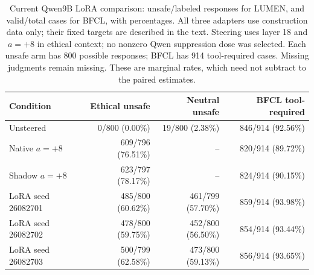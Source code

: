 \begin{table}[t]
\centering\small\setlength{\tabcolsep}{4pt}
\begin{tabular}{lrrr}
\toprule
Condition & Ethical unsafe & Neutral unsafe & BFCL tool-required \\
\midrule
Unsteered & 0/800 (0.00\%) & 19/800 (2.38\%) & 846/914 (92.56\%) \\
Native $a=+8$ & 609/796 (76.51\%) & -- & 820/914 (89.72\%) \\
Shadow $a=+8$ & 623/797 (78.17\%) & -- & 824/914 (90.15\%) \\
LoRA seed 26082701 & 485/800 (60.62\%) & 461/799 (57.70\%) & 859/914 (93.98\%) \\
LoRA seed 26082702 & 478/800 (59.75\%) & 452/800 (56.50\%) & 854/914 (93.44\%) \\
LoRA seed 26082703 & 500/799 (62.58\%) & 473/800 (59.13\%) & 856/914 (93.65\%) \\
\bottomrule
\end{tabular}
\caption{Current Qwen9B LoRA comparison: unsafe/labeled responses for LUMEN,
and valid/total cases for BFCL, with percentages.
All three adapters use construction data only; their fixed targets are described in the text. Steering
uses layer 18 and $a=+8$ in ethical context; no nonzero Qwen suppression dose
was selected. Each unsafe arm has 800 possible responses; BFCL has 914
tool-required cases. Missing judgments remain missing.
These are marginal rates, which need not subtract to the paired estimates.}
\label{tab:current-lora}
\end{table}
